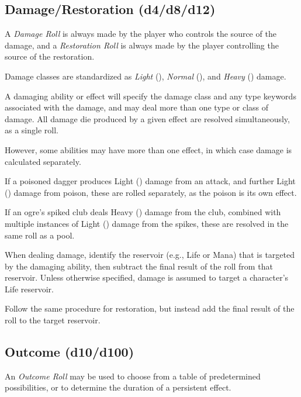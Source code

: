 \subsection{Damage/Restoration (d4/d8/d12)}
A \textit{Damage Roll} is always made by the player who controls 
the source of the damage, and a \textit{Restoration Roll} 
is always made by the player controlling the source of the restoration.

\vspace{0.4em}

Damage classes are standardized as \textit{Light} (), 
\textit{Normal} (), and \textit{Heavy} () damage.

\vspace{0.4em}

A damaging ability or effect will specify the damage class 
and any type keywords associated with the damage,
and may deal more than one type or class of damage.
All damage die produced by a given effect are resolved simultaneously, 
as a single roll. 

\vspace{0.4em}

However, some abilities may have more than one effect, 
in which case damage is calculated separately.

\begin{Example}
  If a poisoned dagger produces Light () damage from an attack, 
  and further Light () damage from poison, 
  these are rolled separately, as the poison is its own effect.

  \vspace{0.4em}

  If an ogre's spiked club deals Heavy () damage from the club, 
  combined with multiple instances of Light () 
  damage from the spikes, these are resolved in the same roll as a pool.
\end{Example}

When dealing damage, identify the reservoir (e.g., Life or Mana) 
that is targeted by the damaging ability, 
then subtract the final result of the roll from that reservoir.
Unless otherwise specified, 
damage is assumed to target a character's Life reservoir.

Follow the same procedure for restoration, 
but instead add the final result of the roll to the target reservoir.


\subsection{Outcome (d10/d100)}
An \textit{Outcome Roll} may be used to choose from a table of 
predetermined possibilities, 
or to determine the duration of a persistent effect.

